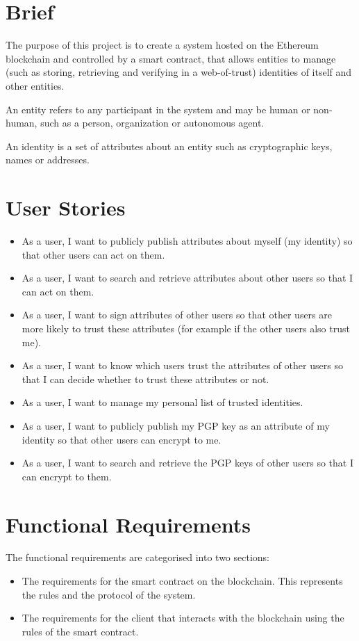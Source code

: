 \documentclass[12pt,a4paper]{report}
\begin{document}
	\section{Brief}
	The purpose of this project is to create a system hosted on the Ethereum blockchain and controlled by a smart contract, that allows entities to manage (such as storing, retrieving and verifying in a web-of-trust) identities of itself and other entities.
	
	An entity refers to any participant in the system and may be human or non-human, such as a person, organization or autonomous agent.
	
	An identity is a set of attributes about an entity such as cryptographic keys, names or addresses.
	
	\section{User Stories}
	\begin{itemize}
		\item As a user, I want to publicly publish attributes about myself (my identity) so that other users can act on them.
		\item As a user, I want to search and retrieve attributes about other users so that I can act on them.
		\item As a user, I want to sign attributes of other users so that other users are more likely to trust these attributes (for example if the other users also trust me).
		\item As a user, I want to know which users trust the attributes of other users so that I can decide whether to trust these attributes or not.
		\item As a user, I want to manage my personal list of trusted identities.
		\item As a user, I want to publicly publish my PGP key as an attribute of my identity so that other users can encrypt to me.
		\item As a user, I want to search and retrieve the PGP keys of other users so that I can encrypt to them.
	\end{itemize}
	
	\section{Functional Requirements}
	The functional requirements are categorised into two sections:
	\begin{itemize}
		\item The requirements for the smart contract on the blockchain. This represents the rules and the protocol of the system.
		\item The requirements for the client that interacts with the blockchain using the rules of the smart contract.
	\end{itemize}		
	
\end{document}
